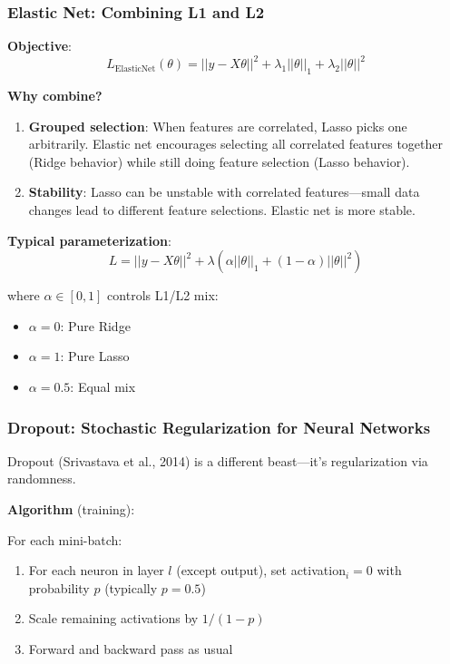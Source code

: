 \subsubsection{Elastic Net: Combining L1 and L2}

\textbf{Objective}:
\begin{equation}
L_{\text{ElasticNet}}(\theta) = ||y - X\theta||^2 + \lambda_1||\theta||_1 + \lambda_2||\theta||^2
\end{equation}

\textbf{Why combine?}

\begin{enumerate}
    \item \textbf{Grouped selection}: When features are correlated, Lasso picks one arbitrarily. Elastic net encourages selecting all correlated features together (Ridge behavior) while still doing feature selection (Lasso behavior).

    \item \textbf{Stability}: Lasso can be unstable with correlated features—small data changes lead to different feature selections. Elastic net is more stable.
\end{enumerate}

\textbf{Typical parameterization}:
\begin{equation}
L = ||y - X\theta||^2 + \lambda(\alpha||\theta||_1 + (1-\alpha)||\theta||^2)
\end{equation}

where $\alpha \in [0, 1]$ controls L1/L2 mix:
\begin{itemize}
    \item $\alpha = 0$: Pure Ridge
    \item $\alpha = 1$: Pure Lasso
    \item $\alpha = 0.5$: Equal mix
\end{itemize}

\subsubsection{Dropout: Stochastic Regularization for Neural Networks}

Dropout (Srivastava et al., 2014) is a different beast—it's regularization via randomness.

\textbf{Algorithm} (training):

For each mini-batch:
\begin{enumerate}
    \item For each neuron in layer $l$ (except output), set activation$_i = 0$ with probability $p$ (typically $p = 0.5$)
    \item Scale remaining activations by $1/(1-p)$
    \item Forward and backward pass as usual
\end{enumerate}

